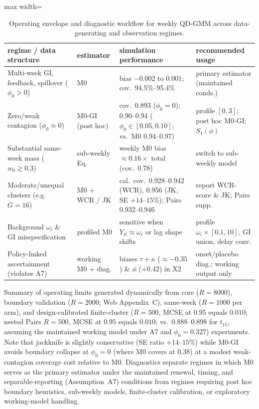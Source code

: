 \begin{table}[!t]
\centering
\caption{Operating envelope and diagnostic workflow for weekly QD-GMM across data-generating and observation regimes.}
\label{tab:envelope}
\footnotesize
\setlength{\tabcolsep}{3.4pt}
\begin{adjustbox}{max width=\linewidth}
\begin{tabular}{llll}
\toprule
regime / data structure & estimator & simulation performance & recommended usage \\
\midrule
Multi-week GI, feedback, spillover ($\phi_0>0$) & M0 & bias $-0.002$ to $0.001$; cov.\ 94.5\%--95.4\% & primary estimator (maintained conds.) \\
Zero/weak contagion ($\phi_0\approx 0$) & M0-GI (post hoc) & cov.\ 0.893 ($\phi_0=0$); 0.90--0.94 ($\phi_0\in[0.05,0.10]$; vs.\ M0 0.94--0.97) & profile $[0,3]$; post hoc M0-GI; $S_1(\phi)$ \\
Substantial same-week mass ($w_0\gtrsim 0.3$) & sub-weekly Eq. & weekly M0 bias $\approx 0.16\times$ total (cov.\ 0.78) & switch to sub-weekly model \\
Moderate/unequal clusters (e.g.\ $G=16$) & M0 + WCR / JK & cal.\ cov.\ 0.928--0.942 (WCR), 0.956 (JK, SE $+14$--$15$\%); Pairs 0.932--0.946 & report WCR-score \& JK; Pairs supp. \\
Background $\omega_i$ \& GI misspecification & profiled M0 & sensitive when $Y_{it}\approx\omega_i$ or lag shape shifts & profile $\omega_i\times[0.1,10]$, GI union, delay conv. \\
Policy-linked ascertainment (violates A7) & working M0 + diag. & biases $\tau+\kappa$ ($\approx -0.35$) \& $\phi$ ($+0.42$) in X2 & onset/placebo diag.; working output only \\
\bottomrule
\end{tabular}
\end{adjustbox}
\par\smallskip\parbox{\linewidth}{\scriptsize Summary of operating limits generated dynamically from core ($R=8000$), boundary validation ($R=2000$; Web Appendix~C), same-week ($R=1000$ per arm), and design-calibrated finite-cluster ($R=500$, MCSE at $0.95$ equals $0.010$; nested Pairs $R=500$, MCSE at $0.95$ equals $0.010$; vs.\ $0.888$--$0.898$ for $t_{15}$, assuming the maintained working model under A7 and $\phi_0=0.327$) experiments. Note that jackknife is slightly conservative (SE ratio $+14$--$15$\%) while M0-GI avoids boundary collapse at $\phi_0=0$ (where M0 covers at 0.38) at a modest weak-contagion coverage cost relative to M0. Diagnostics separate regimes in which M0 serves as the primary estimator under the maintained renewal, timing, and separable-reporting (Assumption~A7) conditions from regimes requiring post hoc boundary heuristics, sub-weekly models, finite-cluster calibration, or exploratory working-model handling.}
\end{table}
